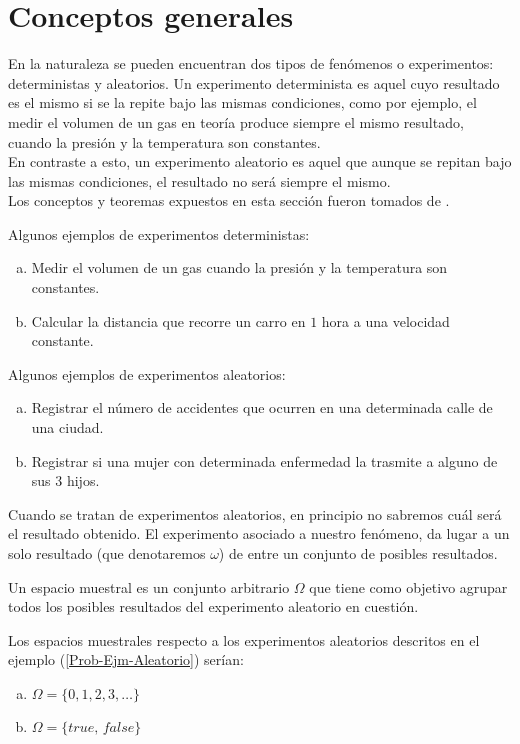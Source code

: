 \section{Conceptos generales}
    En la naturaleza se pueden encuentran dos tipos de fenómenos o experimentos: deterministas y aleatorios. Un experimento determinista es aquel cuyo resultado es el mismo si se la repite bajo las mismas condiciones, como por ejemplo, el medir el volumen de un gas en teoría produce siempre el mismo resultado, cuando la presión y la temperatura son constantes.\\
    En contraste a esto, un experimento aleatorio es aquel que aunque se repitan bajo las mismas condiciones, el resultado no será siempre el mismo.\\
    Los conceptos y teoremas expuestos en esta sección fueron tomados de \cite{Rincon1} \cite{Rincon2}.
\begin{Ejm}
    Algunos ejemplos de experimentos deterministas:
    \begin{enumerate}[a)]
        \item Medir el volumen de un gas cuando la presión y la temperatura son constantes.
        \item Calcular la distancia que recorre un carro en $1$ hora a una velocidad constante.
    \end{enumerate}
\end{Ejm}
\begin{Ejm}
\label{Prob-Ejm-Aleatorio}
Algunos ejemplos de experimentos aleatorios:
    \begin{enumerate}[a)]
        \item Registrar el número de accidentes que ocurren en una determinada calle de una ciudad.
        \item Registrar si una mujer con  determinada enfermedad la trasmite a alguno de sus 3 hijos.
    \end{enumerate}
\end{Ejm}
Cuando se tratan de experimentos aleatorios, en principio no sabremos cuál será el resultado obtenido. El experimento asociado a nuestro fenómeno, da lugar a un solo resultado (que denotaremos $\omega$) de entre un conjunto de posibles resultados.
\begin{Def}
Un espacio muestral es un conjunto arbitrario $\Omega$ que tiene como objetivo agrupar todos los posibles resultados del experimento aleatorio en cuestión.
\end{Def}
\begin{Ejm}
Los espacios muestrales respecto a los experimentos aleatorios descritos en el ejemplo (\ref{Prob-Ejm-Aleatorio}) serían:
\begin{enumerate}[a)]
    \item $\Omega=\{0,1,2,3,\ldots\}$
    \item $\Omega=\{\textit{true, false}\}$
\end{enumerate}
\end{Ejm}
